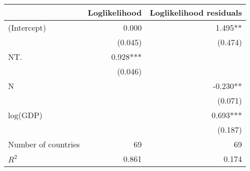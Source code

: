 \begin{tabular}{|l||r|r|}
\hline
                    & \multicolumn{1}{c|}{Loglikelihood} & \multicolumn{1}{c|}{Loglikelihood residuals} \\ 
\hline
\hline
(Intercept)         &                             0.000 &                                     1.495** \\ 
                    &                           (0.045) &                                     (0.474) \\
                    \hline
NT.                 &                          0.928*** &                                             \\ 
                    &                           (0.046) &                                             \\
                    \hline 
N                   &                                   &                                    -0.230** \\ 
                    &                                   &                                     (0.071) \\
                    \hline
log(GDP)            &                                   &                                    0.693*** \\ 
                    &                                   &                                     (0.187) \\
\hline
\hline
Number of countries &                                69 &                                          69 \\
\hline
$R^2$               &                             0.861 &                                       0.174 \\ 
\hline
\end{tabular}